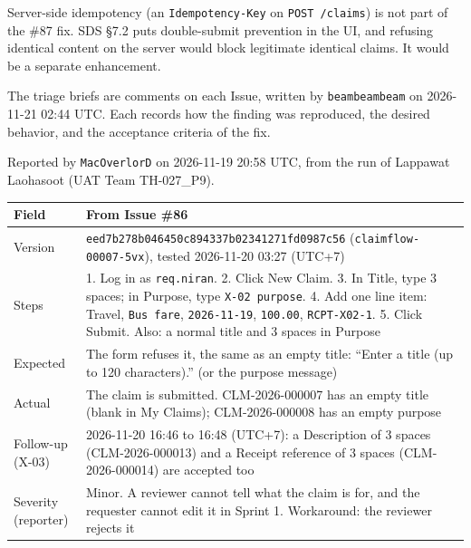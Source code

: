 Server-side idempotency (an \texttt{Idempotency-Key} on \texttt{POST /claims}) is not part of the \#87 fix. SDS §7.2 puts double-submit prevention in the UI, and refusing identical content on the server would block legitimate identical claims. It would be a separate enhancement.

The triage briefs are comments on each Issue, written by \texttt{beambeambeam} on 2026-11-21 02:44 UTC. Each records how the finding was reproduced, the desired behavior, and the acceptance criteria of the fix.


Reported by \texttt{MacOverlorD} on 2026-11-19 20:58 UTC, from the run of Lappawat Laohasoot (UAT Team TH-027\_P9).

\begin{longtable}{@{}R{3cm}R{13cm}@{}}
\toprule \textbf{Field} & \textbf{From Issue \#86} \\ \midrule \endhead
Version & \texttt{eed7b278b046450c894337b02341271fd0987c56} (\texttt{claimflow-00007-5vx}), tested 2026-11-20 03:27 (UTC+7) \\
Steps & 1. Log in as \texttt{req.niran}. 2. Click New Claim. 3. In Title, type 3 spaces; in Purpose, type \texttt{X-02 purpose}. 4. Add one line item: Travel, \texttt{Bus fare}, \texttt{2026-11-19}, \texttt{100.00}, \texttt{RCPT-X02-1}. 5. Click Submit. Also: a normal title and 3 spaces in Purpose \\
Expected & The form refuses it, the same as an empty title: ``Enter a title (up to 120 characters).'' (or the purpose message) \\
Actual & The claim is submitted. CLM-2026-000007 has an empty title (blank in My Claims); CLM-2026-000008 has an empty purpose \\
Follow-up (X-03) & 2026-11-20 16:46 to 16:48 (UTC+7): a Description of 3 spaces (CLM-2026-000013) and a Receipt reference of 3 spaces (CLM-2026-000014) are accepted too \\
Severity (reporter) & Minor. A reviewer cannot tell what the claim is for, and the requester cannot edit it in Sprint 1. Workaround: the reviewer rejects it \\
\bottomrule
\end{longtable}


